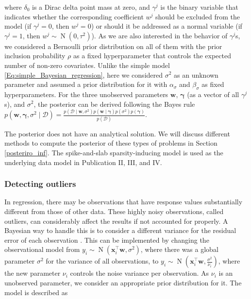 \documentclass[dissertation,math,vertlayout,pdfa,colorlinks]{aaltoseries}
\newcommand{\bw}{\bm{w}}
\newcommand{\bD}{\mathcal{D}}
\DeclareMathOperator{\normalpdf}{N}
\newcommand{\tp}{^{\top}}
\begin{document}
\noindent where $\delta_0$ is a Dirac delta point mass at zero, and $\gamma^j$ is the binary variable that indicates whether the corresponding coefficient $w^j$ should be excluded from the model (if $\gamma^j=0$, then $w^j=0$) or should it be addressed as a normal variable (if $\gamma^j=1$, then $w^j \sim \normalpdf(0, \tau^2)$). As we are also interested in the behavior of $\gamma^j$s, we considered a Bernoulli prior distribution on all of them with the prior inclusion probability $\rho$ as a fixed hyperparameter that controls the expected number of non-zero covariates. Unlike the simple model \ref{Eq:simple_Bayesian_regression}, here we considered $\sigma^{2}$ as an unknown parameter and assumed a prior distribution for it with $\alpha_{\sigma}$ and $\beta_{\sigma}$ as fixed hyperparameters. For the three unobserved parameters $\bw$, $\bm{\gamma}$ (as a vector of all $\gamma^j$s), and $\sigma^2$, the posterior can be derived following the Bayes rule $p(\bw, \bm{\gamma}, \sigma^2 \mid \bD) = \frac{p(\bD \mid \bw, \sigma^2)p(\bw \mid \bm{\gamma})p(\sigma^2)p(\bm{\gamma})}{p(\bD)}$. %

The posterior does not have an analytical solution. We will discuss different methods to compute the posterior of these types of problems in Section \ref{posteriro_inf}. The spike-and-slab sparsity-inducing model \cite{spike_slab1993} is used as the underlying data model in Publication II, III, and IV. 


\subsubsection{Detecting outliers}

In regression, there may be observations that have response values substantially different from those of other data. These highly noisy observations, called outliers, can considerably affect the results if not accounted for properly. A Bayesian way to handle this is to consider a different variance for the residual error of each observation \cite{Bayesian_ARD2007,Kangasraasio_2016_interactive}. This can be implemented by changing the observational model from $y_i\sim \normalpdf(\bm{x}_i\tp\bw,\sigma^2)$, where there was a global parameter $\sigma^2$ for the variance of all observations, to $y_i \sim \normalpdf(\bm{x}_i\tp\bw,\frac{\sigma^2}{\nu_i})$, where the new parameter $\nu_i$ controls the noise variance per observation. As $\nu_i$ is an unobserved parameter, we consider an appropriate prior distribution for it. The model is described as 
\end{document}
